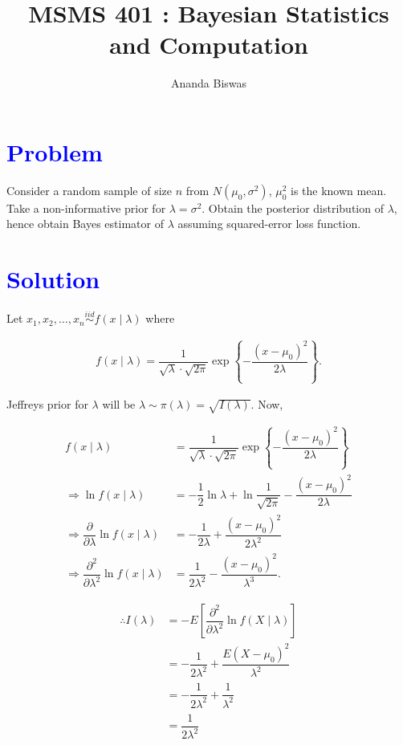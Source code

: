 \documentclass[12pt, a4paper]{article}
\title{MSMS 401 : Bayesian Statistics and Computation}
\author{{\fontsize{25}{20} \benyorithafont Ananda Biswas}}
\date{}
\begin{document}
\maketitle

\section*{\faArrowAltCircleRight[regular] \textcolor{blue}{Problem}}

Consider a random sample of size $n$ from $N(\mu_0, \sigma^2)$, $\mu_0^2$ is the known mean. Take a non-informative prior for $\lambda = \sigma^2$. Obtain the posterior distribution of $\lambda$, hence obtain Bayes estimator of $\lambda$ assuming squared-error loss function.

\section*{\faArrowAltCircleRight[regular] \textcolor{blue}{Solution}}

Let $x_1, x_2, \ldots, x_n \overset{iid}{\sim} f(x \mid \lambda)$ where

\begin{align*}
f(x \mid \lambda) = \dfrac{1}{\sqrt{\lambda} \cdot \sqrt{2\pi}} \exp\left\{ -\dfrac{(x-\mu_0)^2}{2\lambda} \right\}.
\end{align*}

Jeffreys prior for $\lambda$ will be $\lambda \sim \pi(\lambda) = \sqrt{I(\lambda)}$. Now, 

\begin{align*}
f(x \mid \lambda) &= \dfrac{1}{\sqrt{\lambda} \cdot \sqrt{2\pi}} \exp\left\{ -\dfrac{(x-\mu_0)^2}{2\lambda} \right\} \\[1em]
\Rightarrow \ln f(x \mid \lambda) &= - \dfrac{1}{2} \ln \lambda + \ln \dfrac{1}{\sqrt{2\pi}} -\dfrac{(x-\mu_0)^2}{2\lambda} \\[1em]
\Rightarrow \dfrac{\partial}{\partial \lambda} \ln f(x \mid \lambda) &= - \dfrac{1}{2\lambda} + \dfrac{(x-\mu_0)^2}{2\lambda^2} \\[1em]
\Rightarrow \dfrac{\partial^2}{\partial \lambda^2} \ln f(x \mid \lambda)  &= \dfrac{1}{2\lambda^2} - \dfrac{(x-\mu_0)^2}{\lambda^3}.
\end{align*}

\begin{align*}
\therefore I(\lambda) &= -E\left[ \dfrac{\partial^2}{\partial \lambda^2} \ln f(X \mid \lambda) \right] \\[1em]
&= - \dfrac{1}{2\lambda^2} + \dfrac{E(X - \mu_0)^2}{\lambda^2} \\[1em]
&= - \dfrac{1}{2\lambda^2} + \dfrac{1}{\lambda^2} \\[1em]
&= \dfrac{1}{2\lambda^2}
\end{align*}
\end{document}

